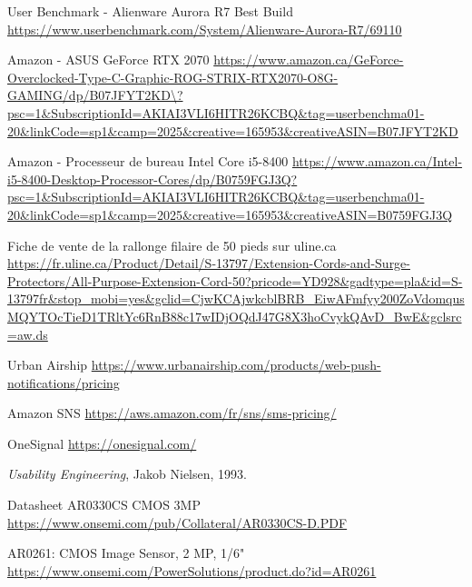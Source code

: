 \begin{thebibliographyUL}{9}
 User Benchmark - Alienware Aurora R7 Best Build
\url{https://www.userbenchmark.com/System/Alienware-Aurora-R7/69110}

 Amazon - ASUS GeForce RTX 2070 \url{https://www.amazon.ca/GeForce-Overclocked-Type-C-Graphic-ROG-STRIX-RTX2070-O8G-GAMING/dp/B07JFYT2KD\?psc=1\&SubscriptionId=AKIAI3VLI6HITR26KCBQ\&tag=userbenchma01-20\&linkCode=sp1\&camp=2025\&creative=165953\&creativeASIN=B07JFYT2KD}

 Amazon - Processeur de bureau Intel Core i5-8400 \url{https://www.amazon.ca/Intel-i5-8400-Desktop-Processor-Cores/dp/B0759FGJ3Q?psc=1\&SubscriptionId=AKIAI3VLI6HITR26KCBQ\&tag=userbenchma01-20\&linkCode=sp1\&camp=2025\&creative=165953\&creativeASIN=B0759FGJ3Q}

 Fiche de vente de la rallonge filaire de 50 pieds sur uline.ca 
\url{https://fr.uline.ca/Product/Detail/S-13797/Extension-Cords-and-Surge-Protectors/All-Purpose-Extension-Cord-50?pricode=YD928&gadtype=pla&id=S-13797fr&stop_mobi=yes&gclid=CjwKCAjwkcblBRB_EiwAFmfyy200ZoVdomqusMQYTOcTieD1TRltYc6RnB88c17wIDjOQdJ47G8X3hoCvykQAvD_BwE&gclsrc=aw.ds}

 Urban Airship \url{https://www.urbanairship.com/products/web-push-notifications/pricing}

 Amazon SNS \url{https://aws.amazon.com/fr/sns/sms-pricing/}

 OneSignal \url{https://onesignal.com/}

 \emph{Usability Engineering}, Jakob Nielsen, 1993.

 Datasheet AR0330CS CMOS 3MP  \url{https://www.onsemi.com/pub/Collateral/AR0330CS-D.PDF}

 AR0261: CMOS Image Sensor, 2 MP, 1/6" \url{https://www.onsemi.com/PowerSolutions/product.do?id=AR0261}

\end{thebibliographyUL}